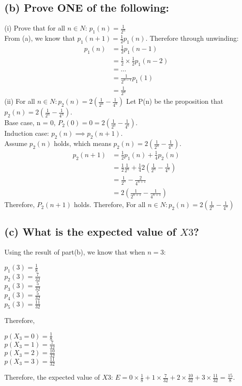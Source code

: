 \documentclass[]{article}
\begin{document}
\begin{spacing}{1.5}
	
	\subsection*{(b) Prove ONE of the following:}
	(i) Prove that for all $ n \in N $: $  p_1(n) = \frac{1}{2^n} $\\
	From (a), we know that $ p_1(n+1) = \frac{1}{2}p_1(n)  $. Therefore through unwinding:
	\[
	\begin{array}{rl}
		p_1(n) &=\frac{1}{2}p_1(n-1)\\
		&= \frac{1}{2} \times \frac{1}{2}p_1(n-2) \\
		&= ... \\
		&= \frac{1}{2^{n-1}}p_1(1)\\
		&= \frac{1}{2^{n}}
	\end{array}
	\]
	(ii) For all $ n \in N:  p_2(n)=2(\frac{1}{2^n}-\frac{1}{4^n})$
	Let P(n) be the proposition that $ p_2(n)=2(\frac{1}{2^n}-\frac{1}{4^n}) $.\\
	Base case, n = 0, $ P_2(0) = 0 = 2(\frac{1}{2^0}-\frac{1}{4^0}) $.\\
	Induction case: $ p_2(n) \implies p_2(n+1)$.\\
	Assume $ p_2(n) $ holds, which means $  p_2(n)=2(\frac{1}{2^n}-\frac{1}{4^n}) $.\\
		\[
	\begin{array}{rl}
		 p_2(n+1) &= \frac{1}{2}p_1(n) + \frac{1}{4}p_2(n)\\
		&= \frac{1}{2}\frac{1}{2^{n}} + \frac{1}{4}2(\frac{1}{2^n}-\frac{1}{4^n}) \\
		&= \frac{1}{2^{n}}-\frac{2}{4^{n+1}} \\
		&= 2(\frac{1}{2^{n+1}}-\frac{1}{4^{n+1}}) 
	\end{array}
	\]
	Therefore, $ P_2(n+1) $ holds. Therefore, For all $ n \in N:  p_2(n)=2(\frac{1}{2^n}-\frac{1}{4^n})$
	
	\subsection*{(c) What is the expected value of $ X3 $?}
	Using the result of part(b), we know that when $ n=3 $:
	\begin{center}
		$ p_1(3) = \frac{1}{8} $\\
		$ p_2(3) = \frac{7}{32} $\\
		$ p_3(3) = \frac{5}{32} $\\
		$ p_4(3) = \frac{5}{32} $\\
		$ p_5(3) = \frac{11}{32} $
	\end{center}
	Therefore, 
	\begin{center}
		$ p(X_3=0) = \frac{1}{8} $\\
		$ p(X_3=1) = \frac{7}{32} $\\
		$ p(X_3=2) = \frac{10}{32} $\\
		$ p(X_3=3) = \frac{11}{32} $
	\end{center}
	Therefore, the expected value of $ X3 $:
	$ E = 0 \times \frac{1}{8} + 1 \times \frac{7}{32} + 2 \times  \frac{10}{32} + 3 \times \frac{11}{32} = \frac{15}{8} $.
	

\end{spacing}
\end{document}
